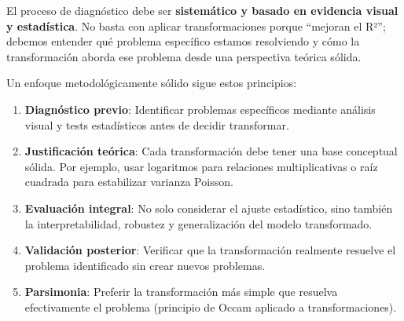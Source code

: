 \documentclass[
  letterpaper,
  DIV=11,
  numbers=noendperiod]{scrreprt}
\begin{document}
El proceso de diagnóstico debe ser \textbf{sistemático y basado en
evidencia visual y estadística}. No basta con aplicar transformaciones
porque ``mejoran el R²''; debemos entender qué problema específico
estamos resolviendo y cómo la transformación aborda ese problema desde
una perspectiva teórica sólida.

Un enfoque metodológicamente sólido sigue estos principios:

\begin{enumerate}
\def\labelenumi{\arabic{enumi}.}
\item
  \textbf{Diagnóstico previo}: Identificar problemas específicos
  mediante análisis visual y tests estadísticos antes de decidir
  transformar.
\item
  \textbf{Justificación teórica}: Cada transformación debe tener una
  base conceptual sólida. Por ejemplo, usar logaritmos para relaciones
  multiplicativas o raíz cuadrada para estabilizar varianza Poisson.
\item
  \textbf{Evaluación integral}: No solo considerar el ajuste
  estadístico, sino también la interpretabilidad, robustez y
  generalización del modelo transformado.
\item
  \textbf{Validación posterior}: Verificar que la transformación
  realmente resuelve el problema identificado sin crear nuevos
  problemas.
\item
  \textbf{Parsimonia}: Preferir la transformación más simple que
  resuelva efectivamente el problema (principio de Occam aplicado a
  transformaciones).
\end{enumerate}
\end{document}
